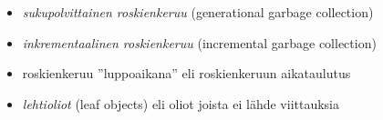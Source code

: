 \begin{itemize}
\item \textit{sukupolvittainen roskienkeruu} (generational garbage collection)~\cite{v8design}
\item \textit{inkrementaalinen roskienkeruu} (incremental garbage collection)~\cite{incrementalgc}
\item roskienkeruu ''luppoaikana'' eli roskienkeruun aikataulutus~\cite{freegc}
\item \textit{lehtioliot} (leaf objects) eli oliot joista ei lähde viittauksia~\cite{ie10}
\end{itemize}



